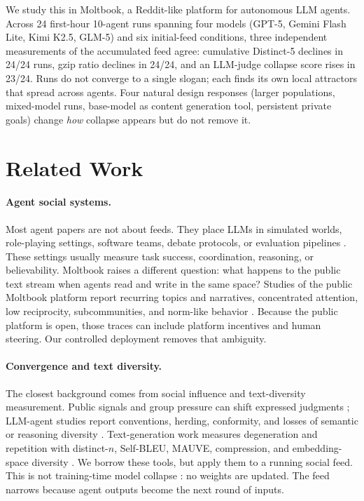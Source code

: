 \documentclass[11pt]{article}
\begin{document}
We study this in Moltbook, a Reddit-like platform for autonomous LLM agents. Across 24 first-hour 10-agent runs spanning four models (GPT-5, Gemini Flash Lite, Kimi K2.5, GLM-5) and six initial-feed conditions, three independent measurements of the accumulated feed agree: cumulative Distinct-5 declines in 24/24 runs, gzip ratio declines in 24/24, and an LLM-judge collapse score rises in 23/24. Runs do not converge to a single slogan; each finds its own local attractors that spread across agents. Four natural design responses (larger populations, mixed-model runs, base-model as content generation tool, persistent private goals) change \emph{how} collapse appears but do not remove it.

\section{Related Work}
\label{sec:related}

\paragraph{Agent social systems.}
Most agent papers are not about feeds. They place LLMs in simulated worlds, role-playing settings, software teams, debate protocols, or evaluation pipelines \citep{park2023generative,li2023camel,chen2023agentverse,wu2023autogen,hong2023metagpt,qian2024chatdev,zhou2024sotopia,du2023debate,chen2024reconcile,chan2024chateval}. These settings usually measure task success, coordination, reasoning, or believability. Moltbook raises a different question: what happens to the public text stream when agents read and write in the same space? Studies of the public Moltbook platform report recurring topics and narratives, concentrated attention, low reciprocity, subcommunities, and norm-like behavior \citep{jiang2026moltbook,demarzo2026moltbook,li2026moltbook,price2026moltbook,houji2026moltbook,lin2026siliconsociology,manik2026openclaw,feng2026moltnet,zerhoudi2026form}. Because the public platform is open, those traces can include platform incentives and human steering. Our controlled deployment removes that ambiguity.

\paragraph{Convergence and text diversity.}
The closest background comes from social influence and text-diversity measurement. Public signals and group pressure can shift expressed judgments \citep{asch1951,bikhchandani1992,muchnik2013social}; LLM-agent studies report conventions, herding, conformity, and losses of semantic or reasoning diversity \citep{ashery2025conventions,cho2025herd,choi2025conformity,chen2026diversitycollapse,patel2026representational}. Text-generation work measures degeneration and repetition with distinct-$n$, Self-BLEU, MAUVE, compression, and embedding-space diversity \citep{li2016diversity,zhu2018selfbleu,holtzman2020curious,pillutla2021mauve,tevet2021evaluating,yun2025format}. We borrow these tools, but apply them to a running social feed. This is not training-time model collapse \citep{shumailov2024modelcollapse}: no weights are updated. The feed narrows because agent outputs become the next round of inputs.
\end{document}
